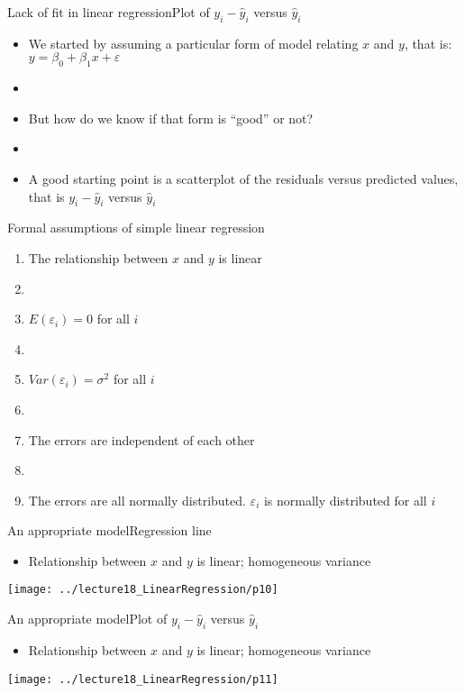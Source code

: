 \documentclass[xcolor=dvipsnames]{beamer}
\begin{document}
\begin{frame}{Lack of fit in linear regression}{Plot of $y_i - \hat{y}_i$ versus $\hat{y}_i$}
	\begin{itemize}
		\item We started by assuming a particular form of model relating $x$ and $y$, that is: $y = \beta_0 + \beta_1 x + \varepsilon$ \pause
		\item[]
		\item But how do we know if that form is ``good'' or not? \pause
		\item[]
		\item A good starting point is a scatterplot of the residuals versus predicted values, that is $y_i - \hat{y}_i$ versus $\hat{y}_i$ 
	\end{itemize}
\end{frame}

\begin{frame}{Formal assumptions of simple linear regression}
\begin{enumerate}
	\item The relationship between $x$ and $y$ is linear
	\item[]
	\item $E(\varepsilon_i) = 0$ for all $i$
	\item[]
	\item $Var(\varepsilon_i) = \sigma^2$ for all $i$
	\item[]
	\item The errors are independent of each other
	\item[]
	\item The errors are all normally distributed. $\varepsilon_i$ is normally distributed for all $i$
\end{enumerate}
\end{frame}

\begin{frame}{An appropriate model}{Regression line}
\begin{itemize}
	\item Relationship between $x$ and $y$ is linear; homogeneous variance 
\end{itemize}
	\begin{center}
		\texttt{[image: ../lecture18\_LinearRegression/p10]}
	\end{center}
\end{frame}

\begin{frame}{An appropriate model}{Plot of $y_i - \hat{y}_i$ versus $\hat{y}_i$}
\begin{itemize}
	\item Relationship between $x$ and $y$ is linear; homogeneous variance
\end{itemize}
\begin{center}
	\texttt{[image: ../lecture18\_LinearRegression/p11]}
\end{center}
\end{frame}
\end{document}
